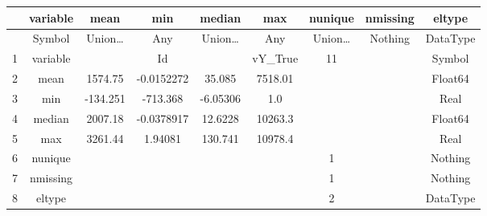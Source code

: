 \begin{tabular}{r|cccccccc}
	& variable & mean & min & median & max & nunique & nmissing & eltype\\
	\hline
	& Symbol & Union… & Any & Union… & Any & Union… & Nothing & DataType\\
	\hline
	1 & variable &  & Id &  & vY\_True & 11 &  & Symbol \\
	2 & mean & 1574.75 & -0.0152272 & 35.085 & 7518.01 &  &  & Float64 \\
	3 & min & -134.251 & -713.368 & -6.05306 & 1.0 &  &  & Real \\
	4 & median & 2007.18 & -0.0378917 & 12.6228 & 10263.3 &  &  & Float64 \\
	5 & max & 3261.44 & 1.94081 & 130.741 & 10978.4 &  &  & Real \\
	6 & nunique &  &  &  &  & 1 &  & Nothing \\
	7 & nmissing &  &  &  &  & 1 &  & Nothing \\
	8 & eltype &  &  &  &  & 2 &  & DataType \\
\end{tabular}
